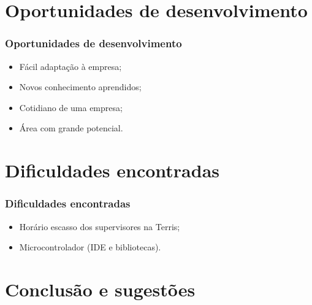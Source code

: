 \section{Oportunidades de desenvolvimento}


\begin{frame}
\frametitle{Oportunidades de desenvolvimento}
\begin{itemize}
\item Fácil adaptação à empresa;
\item Novos conhecimento aprendidos;
\item Cotidiano de uma empresa;
\item Área com grande potencial.
\end{itemize}
\end{frame}

\section{Dificuldades encontradas}


\begin{frame}
\frametitle{Dificuldades encontradas}
\begin{itemize}
\item Horário escasso dos supervisores na Terris;
\item Microcontrolador (IDE e bibliotecas).
\end{itemize}
\end{frame}


\section{Conclusão e sugestões}



